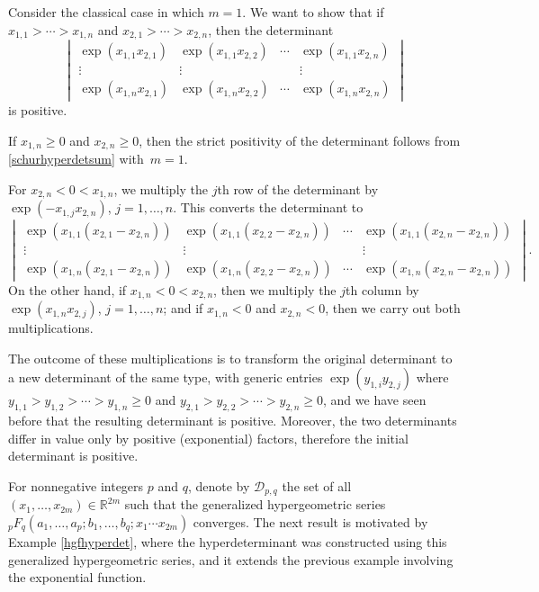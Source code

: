 \documentclass[pdftex]{sigma}
\numberwithin{equation}{section}
\def\R{{\mathbb R}}
\def\mcalD{\mathcal{D}}
\begin{document}
\begin{Example}
Consider the classical case in which $m = 1$. We want to show that if $x_{1,1} > \cdots > x_{1,n}$ and $x_{2,1} > \cdots > x_{2,n}$, then the determinant
\[
\begin{vmatrix}
\exp(x_{1,1}x_{2,1}) & \exp(x_{1,1}x_{2,2}) & \cdots & \exp(x_{1,1}x_{2,n}) \\
\vdots & \vdots & & \vdots \\
\exp(x_{1,n}x_{2,1}) & \exp(x_{1,n}x_{2,2}) & \cdots & \exp(x_{1,n}x_{2,n})
\end{vmatrix}
\]
is positive.

If $x_{1,n} \ge 0$ and $x_{2,n} \ge 0$, then the strict positivity of the determinant follows from \eqref{schurhyperdetsum} with~${m=1}$.

For $x_{2,n} < 0 < x_{1,n}$, we multiply the $j$th row of the determinant by $\exp(-x_{1,j}x_{2,n})$, $j=1,\dots,n$. This converts the determinant to
\[
\begin{vmatrix}
\exp(x_{1,1}(x_{2,1}-x_{2,n})) & \exp(x_{1,1}(x_{2,2}-x_{2,n})) & \cdots & \exp(x_{1,1}(x_{2,n}-x_{2,n})) \\
\vdots & \vdots & & \vdots \\
\exp(x_{1,n}(x_{2,1}-x_{2,n})) & \exp(x_{1,n}(x_{2,2}-x_{2,n})) & \cdots & \exp(x_{1,n}(x_{2,n}-x_{2,n}))
\end{vmatrix}.
\]
On the other hand, if $x_{1,n} < 0 < x_{2,n}$, then we multiply the $j$th column by $\exp(x_{1,n}x_{2,j})$, $j=1,\dots,n$; and if $x_{1,n} < 0$ and $x_{2,n} < 0$, then we carry out both multiplications.

The outcome of these multiplications is to transform the original determinant to a new determinant of the same type, with generic entries $\exp(y_{1,i}y_{2,j})$ where $y_{1,1} > y_{1,2} > \cdots > y_{1,n} \ge 0$ and $y_{2,1} > y_{2,2} > \cdots > y_{2,n} \ge 0$, and we have seen before that the resulting determinant is positive. Moreover, the two determinants differ in value only by positive (exponential) factors, therefore the initial determinant is positive.
\end{Example}


For nonnegative integers $p$ and $q$, denote by $\mcalD_{p,q}$ the set of all $(x_1,\dots,x_{2m}) \in \R^{2m}$ such that the generalized hypergeometric series ${}_pF_q(a_1,\dots,a_p;b_1,\dots,b_q;x_1\cdots x_{2m})$ converges. The next result is motivated by Example \ref{hgfhyperdet}, where the hyperdeterminant was constructed using this generalized hypergeometric series, and it extends the previous example involving the exponential function.
\end{document}
